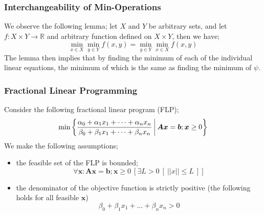 \documentclass[a4paper, 12pt]{article}
\newcommand{\mat}[1]{\boldsymbol{#1}}
\renewcommand{\vec}[1]{\boldsymbol{#1}}
\begin{document}
            \subsubsection*{Interchangeability of Min-Operations}
                We observe the following lemma; let $X$ and $Y$ be arbitrary sets, and let $f : X \times Y \to \mathbb{R}$ and arbitrary function defined on $X \times Y$, then we have;
                $$\min_{x \in X} \min_{y \in Y} f(x, y) = \min_{y \in Y} \min_{x \in X} f(x, y)$$
                The lemma then implies that by finding the minimum of each of the individual linear equations, the minimum of which is the same as finding the minimum of $\psi$.
            \subsubsection*{Fractional Linear Programming}
                Consider the following fractional linear program (FLP);
                $$\min \left\{\frac{\alpha_0 + \alpha_1x_1 + \dots + \alpha_nx_n}{\beta_0 + \beta_1x_1 + \dots + \beta_nx_n}\ \vline\ \mat{A}\vec{x} = \vec{b}; \vec{x} \geq 0 \right\}$$
                We make the following assumptions;
                \begin{itemize}
                    \itemsep0em
                    \item the feasible set of the FLP is bounded;
                        $$\forall \vec{x} : \mat{A}\vec{x} = \vec{b}; \vec{x} \geq 0\ \left[\exists L > 0\ \left[\ || x || \leq L\ \right]\right]$$
                    \item the denominator of the objective function is strictly positive (the following holds for all feasible $\vec{x}$)
                        $$\beta_0 + \beta_1x_1 + \dots + \beta_nx_n > 0$$
                \end{itemize}
\end{document}
